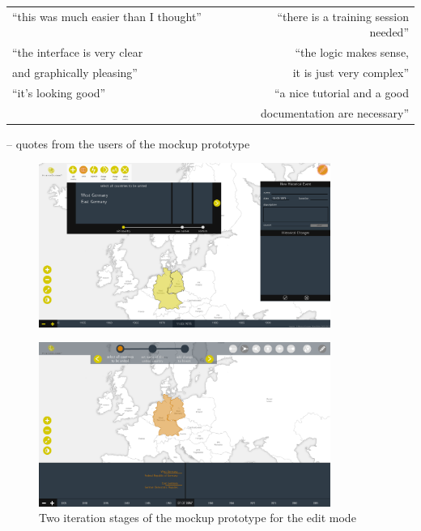 \begin{minipage}[t]{1.0\textwidth}

\begin{quoteit}
  \begin{tabular}{l r}
    ``this was much easier than I thought'' ~~~~~~~~ &
    ``there is a training session needed'' \\[0.5em]
    ``the interface is very clear &
    ``the logic makes sense, \\
    and graphically pleasing'' &
    it is just very complex'' \\[0.5em]
    ``it's looking good'' &
    ``a nice tutorial and a good \\
    & documentation are necessary'' \\
  \end{tabular}
\end{quoteit}
\hfill -- quotes from the users of the mockup prototype
\vspace{2em}

\vspace{1em}
\centering
\begin{figure}[H]
  \centering
  \includegraphics[width=0.85\textwidth]{graphics/development/user_interface_design_process/mockup_prototype_1.png}
\end{figure}
\begin{figure}[H]
  \centering
  \includegraphics[width=0.85\textwidth]{graphics/development/user_interface_design_process/mockup_prototype_3.png}
  \caption{Two iteration stages of the mockup prototype for the edit mode}
  \label{fig:mockup_prototypes}
\end{figure}

\end{minipage}


